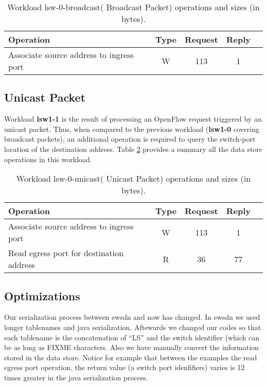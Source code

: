 \begin{table}[ht]
\centering 
\begin{tabular}{l c c c c}
 Operation & Type & Request & Reply \\ \toprule 
 Associate source address to ingress port & W & 113 & 1 \\ \bottomrule
\end{tabular}
\caption[Workload lsw-0-broadcast( Broadcast Packet) operations]{Workload lsw-0-broadcast( Broadcast Packet) operations and sizes (in bytes).}
\label{table:lsw0:broadcast}
\end{table}

\subsection{Unicast Packet}
Workload \textbf{lsw1-1} is the result of processing an OpenFlow request
triggered by an unicast packet. Thus,  when compared to the previous
workload (\textbf{lsw1-0} covering broadcast packets), an additional
operation is required to query the switch-port location of the
destination address. Table \ref{table:lsw0:unicast} provides a summary all the data
store operations in this workload. 

\begin{table}[ht]
\centering 
\begin{tabular}{l c c c c}
 Operation & Type & Request & Reply  \\ \toprule 
 Associate source address to ingress port & W & 113 & 1\\\midrule
Read egress port for destination address & R & 36 & 77 \\\bottomrule
\end{tabular}
\caption[Workload lsw-0-unicast( Unicast Packet) operations]{Workload lsw-0-unicast( Unicast Packet) operations and sizes (in bytes).}
\label{table:lsw0:unicast}
\end{table}

\subsection{Optimizations}
Our serialization process between ewsdn and now has changed. In ewsdn we used longer tablenames and java serialization. Aftewards we changed our codes so that each tablename is the concatenation of ``LS''  and the switch identifier (which can be as long as FIXME characters.  Also we have manually convert the information stored in the data store. Notice for example that between the examples the read egress port operation, the return value (a switch port idenfifiers) varies is 12 times greater in the java serialization process. 


